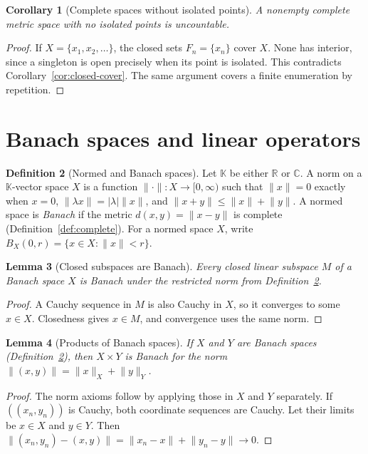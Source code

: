 \documentclass[11pt,a4paper]{article}
\theoremstyle{definition}
\newtheorem{definition}{Definition}[section]
\theoremstyle{plain}
\newtheorem{lemma}[definition]{Lemma}
\newtheorem{corollary}[definition]{Corollary}
\newcommand{\R}{\mathbb{R}}
\newcommand{\C}{\mathbb{C}}
\newcommand{\K}{\mathbb{K}}
\newcommand{\norm}[1]{\lVert #1\rVert}
\begin{document}
\begin{corollary}[Complete spaces without isolated points]\label{cor:uncountable}
A nonempty complete metric space with no isolated points is uncountable.
\end{corollary}
\begin{proof}
If $X=\{x_1,x_2,\ldots\}$, the closed sets $F_n=\{x_n\}$ cover $X$.
None has interior, since a singleton is open precisely when its point
is isolated. This contradicts Corollary~\ref{cor:closed-cover}.
The same argument covers a finite enumeration by repetition.
\end{proof}

\section{Banach spaces and linear operators}

\begin{definition}[Normed and Banach spaces]\label{def:banach}
Let $\K$ be either $\R$ or $\C$. A norm on a $\K$-vector space $X$ is a
function $\norm{\cdot}:X\to[0,\infty)$ such that
$\norm{x}=0$ exactly when $x=0$,
$\norm{\lambda x}=|\lambda|\norm{x}$, and
$\norm{x+y}\le\norm{x}+\norm{y}$.
A normed space is \emph{Banach} if the metric $d(x,y)=\norm{x-y}$ is
complete (Definition~\ref{def:complete}). For a normed space $X$, write
$B_X(0,r)=\{x\in X:\norm{x}<r\}$.
\end{definition}

\begin{lemma}[Closed subspaces are Banach]\label{lem:closed-subspace}
Every closed linear subspace $M$ of a Banach space $X$ is Banach under
the restricted norm from Definition~\ref{def:banach}.
\end{lemma}
\begin{proof}
A Cauchy sequence in $M$ is also Cauchy in $X$, so it converges to some
$x\in X$. Closedness gives $x\in M$, and convergence uses the same norm.
\end{proof}

\begin{lemma}[Products of Banach spaces]\label{lem:product}
If $X$ and $Y$ are Banach spaces (Definition~\ref{def:banach}), then
$X\times Y$ is Banach for the norm
$\norm{(x,y)}=\norm{x}_X+\norm{y}_Y$.
\end{lemma}
\begin{proof}
The norm axioms follow by applying those in $X$ and $Y$ separately.
If $((x_n,y_n))$ is Cauchy, both coordinate sequences are Cauchy.
Let their limits be $x\in X$ and $y\in Y$. Then
$\norm{(x_n,y_n)-(x,y)}=\norm{x_n-x}+\norm{y_n-y}\to0$.
\end{proof}
\end{document}
